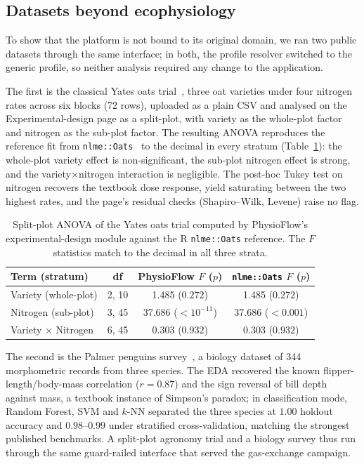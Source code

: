 \documentclass[11pt, letterpaper]{article}
\begin{document}
\subsection{Datasets beyond ecophysiology}\label{sec:ex-generic}

To show that the platform is not bound to its original domain, we ran two public datasets through the same interface; in both, the profile resolver switched to the generic profile, so neither analysis required any change to the application.

The first is the classical Yates oats trial~\cite{Yates1935}, three oat varieties under four nitrogen rates across six blocks (72 rows), uploaded as a plain CSV and analysed on the Experimental-design page as a split-plot, with variety as the whole-plot factor and nitrogen as the sub-plot factor. The resulting ANOVA reproduces the reference fit from \texttt{nlme::Oats}~\cite{Pinheiro2000} to the decimal in every stratum (Table~\ref{tbl:oats}): the whole-plot variety effect is non-significant, the sub-plot nitrogen effect is strong, and the variety$\times$nitrogen interaction is negligible. The post-hoc Tukey test on nitrogen recovers the textbook dose response, yield saturating between the two highest rates, and the page's residual checks (Shapiro--Wilk, Levene) raise no flag.

\begin{table}[htbp]
\centering
\footnotesize
\begin{tabular}{lccc}
\toprule
\textbf{Term (stratum)} & \textbf{df} & \textbf{PhysioFlow $F$ ($p$)} & \textbf{\texttt{nlme::Oats} $F$ ($p$)} \\
\midrule
Variety (whole-plot)      & 2, 10 & 1.485 ($0.272$)        & 1.485 ($0.272$) \\
Nitrogen (sub-plot)       & 3, 45 & 37.686 ($<10^{-11}$)   & 37.686 ($<0.001$) \\
Variety $\times$ Nitrogen & 6, 45 & 0.303 ($0.932$)        & 0.303 ($0.932$) \\
\bottomrule
\end{tabular}
\caption{Split-plot ANOVA of the Yates oats trial computed by PhysioFlow's experimental-design module against the R \texttt{nlme::Oats} reference. The $F$ statistics match to the decimal in all three strata.}\label{tbl:oats}
\end{table}

The second is the Palmer penguins survey~\cite{Gorman2014}, a biology dataset of 344 morphometric records from three species. The EDA recovered the known flipper-length/body-mass correlation ($r=0.87$) and the sign reversal of bill depth against mass, a textbook instance of Simpson's paradox; in classification mode, Random Forest, SVM and $k$-NN separated the three species at $1.00$ holdout accuracy and $0.98$--$0.99$ under stratified cross-validation, matching the strongest published benchmarks. A split-plot agronomy trial and a biology survey thus run through the same guard-railed interface that served the gas-exchange campaign.
\end{document}
